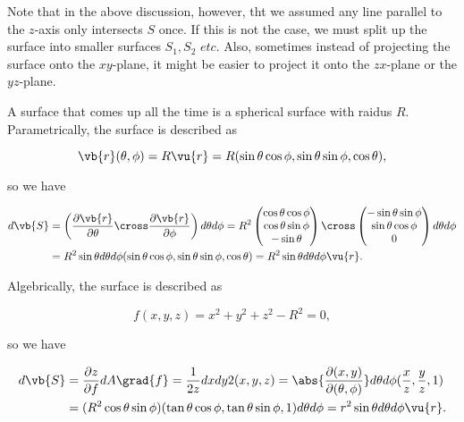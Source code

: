 \documentclass[english,a4paper,12pt]{report}
\begin{document}
Note that in the above discussion, however, tht we assumed any line parallel to the \(z\)-axis only intersects \(S\) once. If this is not the case, we must split up the surface into smaller surfaces \(S_1, S_2 \textit{ etc.}\) Also, sometimes instead of projecting the surface onto the \(xy\)-plane, it might be easier to project it onto the \(zx\)-plane or the \(yz\)-plane.     

A surface that comes up all the time is a spherical surface with raidus \(R\). Parametrically, the surface is described as 

\begin{equation}
	\vb{r} (\theta ,\phi ) = R \vu{r} = R(\sin \theta \cos \phi , \sin \theta \sin \phi , \cos \theta ),
\end{equation}

so we have  

\begin{equation}
	\begin{aligned} 
	d\vb{S} &= \left( \frac{\partial \vb{r} }{\partial \theta }  \cross \frac{\partial \vb{r} }{\partial \phi }   \right) d \theta d\phi = R^2 \begin{pmatrix}
		 \cos \theta \cos \phi  \\
		 \cos \theta \sin \phi  \\
		 -\sin \theta  \\
	\end{pmatrix} \cross \begin{pmatrix}
		 -\sin \theta \sin \phi  \\
		 \sin \theta \cos \phi  \\
		 0 \\
	\end{pmatrix} d \theta d \phi \\
	&= R^2 \sin \theta d \theta d\phi  (\sin \theta \cos \phi , \sin \theta \sin \phi , \cos \theta ) = R^2\sin \theta d \theta d\phi \vu{r} .
	\end{aligned} 
\end{equation}

Algebrically, the surface is described as 

\begin{equation}
	f(x,y,z) = x^2+y^2+z^2 - R^2 = 0,
\end{equation}

so we have

\begin{equation}
	\begin{aligned} 
	d\vb{S} &= \frac{\partial z}{\partial f} dA \grad{f} = \frac{1}{2z} dxdy 2(x,y,z) = \abs{\frac{\partial (x,y)}{\partial (\theta ,\phi )} }d \theta d\phi (\frac{x}{z},\frac{y}{z},1  ) \\
	&= (R^2\cos \theta \sin \phi )(\tan \theta \cos \phi , \tan \theta \sin \phi ,1) d \theta d \phi  = r^2\sin \theta d \theta d\phi \vu{r} .
	\end{aligned} 
\end{equation}
\end{document}
